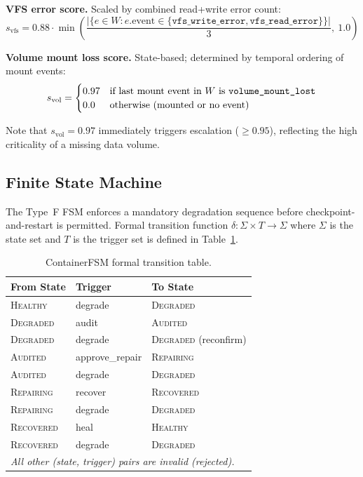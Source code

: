 \documentclass[runningheads]{llncs}
\begin{document}
\noindent\textbf{VFS error score.}  Scaled by combined read+write error count:
\begin{equation}
  s_\text{vfs} = 0.88 \cdot \min\!\left(
    \frac{|\{e \in W : e.\text{event} \in
      \{\texttt{vfs\_write\_error}, \texttt{vfs\_read\_error}\}\}|}{3},
    \ 1.0\right)
  \label{eq:score_vfs}
\end{equation}

\noindent\textbf{Volume mount loss score.}  State-based; determined by
temporal ordering of mount events:
\begin{equation}
  s_\text{vol} =
  \begin{cases}
    0.97 & \text{if last mount event in } W \text{ is \texttt{volume\_mount\_lost}} \\
    0.0  & \text{otherwise (mounted or no event)}
  \end{cases}
  \label{eq:score_vol}
\end{equation}

Note that $s_\text{vol} = 0.97$ immediately triggers escalation
($\geq 0.95$), reflecting the high criticality of a missing data volume.

\subsection{Finite State Machine}

The Type~F FSM enforces a mandatory degradation sequence before
checkpoint-and-restart is permitted.  Formal transition function
$\delta : \Sigma \times T \to \Sigma$ where $\Sigma$ is the state set
and $T$ is the trigger set is defined in Table~\ref{tab:fsm}.

\begin{table}[t]
\centering
\caption{ContainerFSM formal transition table.}
\label{tab:fsm}
\begin{tabular}{lll}
\toprule
\textbf{From State} & \textbf{Trigger} & \textbf{To State} \\
\midrule
\textsc{Healthy}   & degrade         & \textsc{Degraded} \\
\textsc{Degraded}  & audit           & \textsc{Audited}  \\
\textsc{Degraded}  & degrade         & \textsc{Degraded} (reconfirm) \\
\textsc{Audited}   & approve\_repair  & \textsc{Repairing} \\
\textsc{Audited}   & degrade         & \textsc{Degraded} \\
\textsc{Repairing} & recover         & \textsc{Recovered} \\
\textsc{Repairing} & degrade         & \textsc{Degraded} \\
\textsc{Recovered} & heal            & \textsc{Healthy} \\
\textsc{Recovered} & degrade         & \textsc{Degraded} \\
\midrule
\multicolumn{3}{l}{\textit{All other (state, trigger) pairs are invalid (rejected).}} \\
\bottomrule
\end{tabular}
\end{table}
\end{document}

